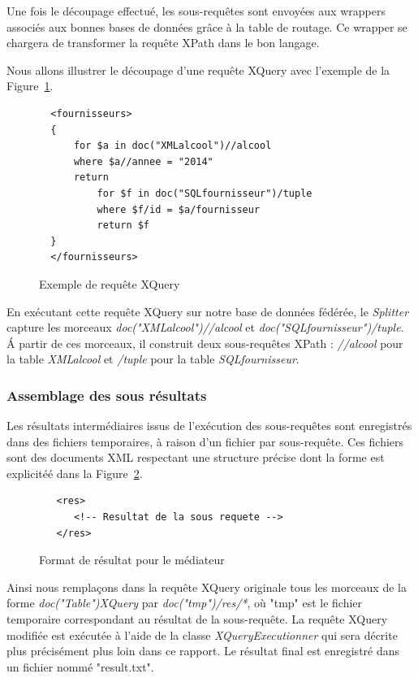 \documentclass[a4paper,10pt]{article}
\newcommand{\fref}[1]{Figure~\ref{#1}}
\begin{document}
Une fois le découpage effectué, les sous-requêtes sont envoyées aux wrappers associés aux bonnes bases de données grâce à la table de routage.
Ce wrapper se chargera de transformer la requête XPath dans le bon langage.

Nous allons illustrer le découpage d'une requête XQuery avec l'exemple de la \fref{lst:exempleRequete}. 

\begin{figure}[ht!]
\begin{verbatim}
  <fournisseurs>
  {
      for $a in doc("XMLalcool")//alcool
      where $a//annee = "2014"
      return
          for $f in doc("SQLfournisseur")/tuple
          where $f/id = $a/fournisseur
          return $f	
  }
  </fournisseurs>
\end{verbatim}
\caption{Exemple de requête XQuery}
\label{lst:exempleRequete}
\end{figure}

En exécutant cette requête XQuery sur notre base de données fédérée, le \emph{Splitter} capture les morceaux \emph{doc("XMLalcool")//alcool} et \emph{doc("SQLfournisseur")/tuple}.
\'A partir de ces morceaux, il construit deux sous-requêtes XPath : \emph{//alcool} pour la table \emph{XMLalcool} et \emph{/tuple} pour la table \emph{SQLfournisseur}.




\subsubsection{Assemblage des sous résultats}

Les résultats intermédiaires issus de l'exécution des sous-requêtes sont enregistrés dans des fichiers temporaires, à raison d'un fichier par sous-requête.
Ces fichiers sont des documents XML respectant une structure précise dont la forme est explicitéé dans la \fref{lst:retourmediateur}.

\begin{figure}[ht!]
\begin{verbatim}
   <res>
      <!-- Resultat de la sous requete -->
   </res>
\end{verbatim}
\caption{Format de résultat pour le médiateur}
\label{lst:retourmediateur}
\end{figure}

Ainsi nous remplaçons dans la requête XQuery originale tous les morceaux de la forme \emph{doc("Table")XQuery} par \emph{doc("tmp")/res/*}, où "tmp" est le fichier temporaire correspondant au résultat de la sous-requête.
La requête XQuery modifiée est exécutée à l'aide de la classe \emph{XQueryExecutionner} qui sera décrite plus précisément plus loin dans ce rapport. 
Le résultat final est enregistré dans un fichier nommé "result.txt".
\end{document}
